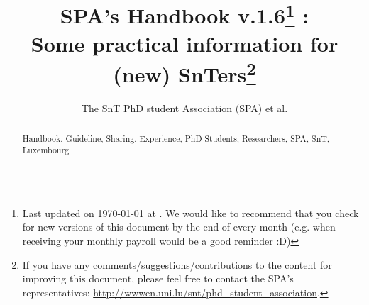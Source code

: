 \documentclass[runningheads,a4paper]{llncs}
\newcommand{\keywords}[1]{\par\addvspace\baselineskip
\noindent\keywordname\enspace\ignorespaces#1}
\newcommand{\SAPcv}{1.6}
\begin{document}
\mainmatter  %

\title{SPA's Handbook v.\SAPcv\thanks{Last updated on \ukvardate\today\xspace at \currenttime.
We would like to recommend that you check for new versions of this document by the end of every month (e.g. when receiving your monthly payroll would be a good reminder :D)} : \\
Some practical information for (new) SnTers\thanks{If you have any comments/suggestions/contributions to the content for improving this document, please feel free to contact the SPA's representatives: \url{http://wwwen.uni.lu/snt/phd_student_association}.}}


\author{The SnT PhD student Association (SPA) et al.
}
%

\maketitle

\begin{abstract}


\keywords{Handbook, Guideline, Sharing, Experience, PhD Students, Researchers, SPA, SnT, Luxembourg}
\end{abstract}

\setcounter{secnumdepth}{2}
\setcounter{tocdepth}{2}
\begin{spacing}{1.3}
\tableofcontents
\end{spacing}

\newpage

\graphicspath{{Figs/PNG/}{Figs/PDF/}{Figs/}}











%









\end{document}
